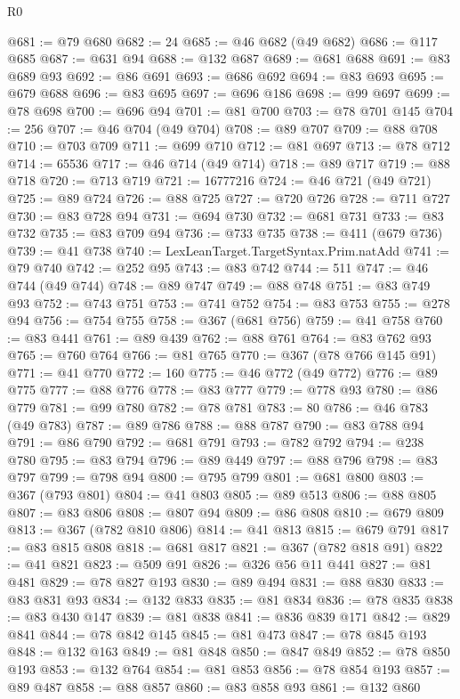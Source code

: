 \begin{lexlean}{R0}
\begin{coremodule}
@681 := @79 @680
@682 := 24
@685 := @46 @682 (@49 @682)
@686 := @117 @685
@687 := @631 @94
@688 := @132 @687
@689 := @681 @688
@691 := @83 @689 @93
@692 := @86 @691
@693 := @686 @692
@694 := @83 @693
@695 := @679 @688
@696 := @83 @695
@697 := @696 @186
@698 := @99 @697
@699 := @78 @698
@700 := @696 @94
@701 := @81 @700
@703 := @78 @701 @145
@704 := 256
@707 := @46 @704 (@49 @704)
@708 := @89 @707
@709 := @88 @708
@710 := @703 @709
@711 := @699 @710
@712 := @81 @697
@713 := @78 @712
@714 := 65536
@717 := @46 @714 (@49 @714)
@718 := @89 @717
@719 := @88 @718
@720 := @713 @719
@721 := 16777216
@724 := @46 @721 (@49 @721)
@725 := @89 @724
@726 := @88 @725
@727 := @720 @726
@728 := @711 @727
@730 := @83 @728 @94
@731 := @694 @730
@732 := @681 @731
@733 := @83 @732
@735 := @83 @709 @94
@736 := @733 @735
@738 := @411 (@679 @736)
@739 := @41 @738
@740 := LexLeanTarget.TargetSyntax.Prim.natAdd
@741 := @79 @740
@742 := @252 @95
@743 := @83 @742
@744 := 511
@747 := @46 @744 (@49 @744)
@748 := @89 @747
@749 := @88 @748
@751 := @83 @749 @93
@752 := @743 @751
@753 := @741 @752
@754 := @83 @753
@755 := @278 @94
@756 := @754 @755
@758 := @367 (@681 @756)
@759 := @41 @758
@760 := @83 @441
@761 := @89 @439
@762 := @88 @761
@764 := @83 @762 @93
@765 := @760 @764
@766 := @81 @765
@770 := @367 (@78 @766 @145 @91)
@771 := @41 @770
@772 := 160
@775 := @46 @772 (@49 @772)
@776 := @89 @775
@777 := @88 @776
@778 := @83 @777
@779 := @778 @93
@780 := @86 @779
@781 := @99 @780
@782 := @78 @781
@783 := 80
@786 := @46 @783 (@49 @783)
@787 := @89 @786
@788 := @88 @787
@790 := @83 @788 @94
@791 := @86 @790
@792 := @681 @791
@793 := @782 @792
@794 := @238 @780
@795 := @83 @794
@796 := @89 @449
@797 := @88 @796
@798 := @83 @797
@799 := @798 @94
@800 := @795 @799
@801 := @681 @800
@803 := @367 (@793 @801)
@804 := @41 @803
@805 := @89 @513
@806 := @88 @805
@807 := @83 @806
@808 := @807 @94
@809 := @86 @808
@810 := @679 @809
@813 := @367 (@782 @810 @806)
@814 := @41 @813
@815 := @679 @791
@817 := @83 @815 @808
@818 := @681 @817
@821 := @367 (@782 @818 @91)
@822 := @41 @821
@823 := @509 @91
@826 := @326 @56 @11 @441
@827 := @81 @481
@829 := @78 @827 @193
@830 := @89 @494
@831 := @88 @830
@833 := @83 @831 @93
@834 := @132 @833
@835 := @81 @834
@836 := @78 @835
@838 := @83 @430 @147
@839 := @81 @838
@841 := @836 @839 @171
@842 := @829 @841
@844 := @78 @842 @145
@845 := @81 @473
@847 := @78 @845 @193
@848 := @132 @163
@849 := @81 @848
@850 := @847 @849
@852 := @78 @850 @193
@853 := @132 @764
@854 := @81 @853
@856 := @78 @854 @193
@857 := @89 @487
@858 := @88 @857
@860 := @83 @858 @93
@861 := @132 @860

\end{coremodule}
\end{lexlean}
